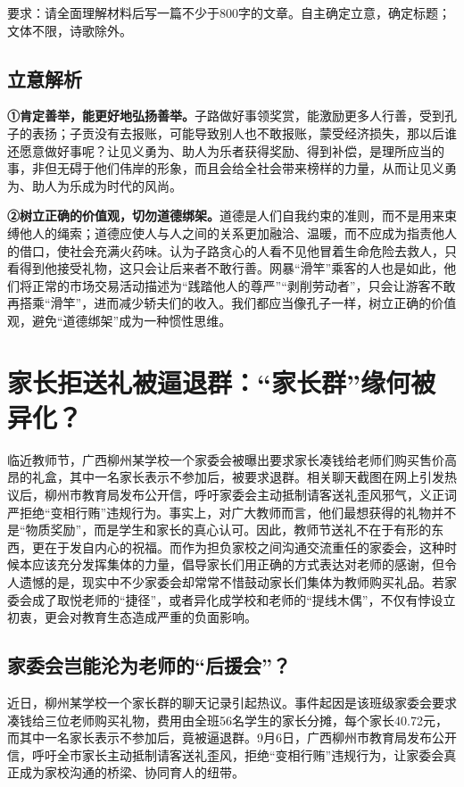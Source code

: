 要求：请全面理解材料后写一篇不少于800字的文章。自主确定立意，确定标题；文体不限，诗歌除外。

\subsection*{立意解析}

\textbf{①肯定善举，能更好地弘扬善举。}子路做好事领奖赏，能激励更多人行善，受到孔子的表扬；子贡没有去报账，可能导致别人也不敢报账，蒙受经济损失，那以后谁还愿意做好事呢？让见义勇为、助人为乐者获得奖励、得到补偿，是理所应当的事，非但无碍于他们伟岸的形象，而且会给全社会带来榜样的力量，从而让见义勇为、助人为乐成为时代的风尚。

\textbf{②树立正确的价值观，切勿道德绑架。}道德是人们自我约束的准则，而不是用来束缚他人的绳索；道德应使人与人之间的关系更加融洽、温暖，而不应成为指责他人的借口，使社会充满火药味。认为子路贪心的人看不见他冒着生命危险去救人，只看得到他接受礼物，这只会让后来者不敢行善。网暴“滑竿”乘客的人也是如此，他们将正常的市场交易活动描述为“践踏他人的尊严”“剥削劳动者”，只会让游客不敢再搭乘“滑竿”，进而减少轿夫们的收入。我们都应当像孔子一样，树立正确的价值观，避免“道德绑架”成为一种惯性思维。

\clearpage
\section*{家长拒送礼被逼退群：“家长群”缘何被异化？}


临近教师节，广西柳州某学校一个家委会被曝出要求家长凑钱给老师们购买售价高昂的礼盒，其中一名家长表示不参加后，被要求退群。相关聊天截图在网上引发热议后，柳州市教育局发布公开信，呼吁家委会主动抵制请客送礼歪风邪气，义正词严拒绝“变相行贿”违规行为。事实上，对广大教师而言，他们最想获得的礼物并不是“物质奖励”，而是学生和家长的真心认可。因此，教师节送礼不在于有形的东西，更在于发自内心的祝福。而作为担负家校之间沟通交流重任的家委会，这种时候本应该充分发挥集体的力量，倡导家长们用正确的方式表达对老师的感谢，但令人遗憾的是，现实中不少家委会却常常不惜鼓动家长们集体为教师购买礼品。若家委会成了取悦老师的“捷径”，或者异化成学校和老师的“提线木偶”，不仅有悖设立初衷，更会对教育生态造成严重的负面影响。

\subsection*{家委会岂能沦为老师的“后援会”？}

近日，柳州某学校一个家长群的聊天记录引起热议。事件起因是该班级家委会要求凑钱给三位老师购买礼物，费用由全班56名学生的家长分摊，每个家长40.72元，而其中一名家长表示不参加后，竟被逼退群。9月6日，广西柳州市教育局发布公开信，呼吁全市家长主动抵制请客送礼歪风，拒绝“变相行贿”违规行为，让家委会真正成为家校沟通的桥梁、协同育人的纽带。

